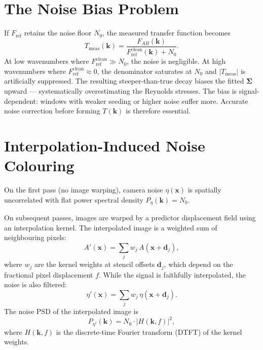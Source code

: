 \documentclass[11pt,a4paper]{article}
\newcommand{\kv}{\mathbf{k}}
\newcommand{\xv}{\mathbf{x}}
\newcommand{\Sigv}{\bm{\Sigma}}
\newcommand{\Fref}{F_\mathrm{ref}}
\newcommand{\Fclean}{F_\mathrm{ref}^\mathrm{clean}}
\begin{document}
\section{The Noise Bias Problem}
\label{sec:noise_bias}

If $\Fref$ retains the noise floor $N_0$, the measured transfer function becomes
%
\begin{equation}
    T_\mathrm{meas}(\kv) = \frac{F_{AB}(\kv)}{\Fclean(\kv) + N_0}.
    \label{eq:t_biased}
\end{equation}
%
At low wavenumbers where $\Fclean \gg N_0$, the noise is negligible.
At high wavenumbers where $\Fclean \approx 0$, the denominator saturates at $N_0$ and $\lvert T_\mathrm{meas}\rvert$ is artificially suppressed.
The resulting steeper-than-true decay biases the fitted $\Sigv$ upward --- systematically overestimating the Reynolds stresses.
The bias is signal-dependent: windows with weaker seeding or higher noise suffer more.
Accurate noise correction before forming $T(\kv)$ is therefore essential.

\section{Interpolation-Induced Noise Colouring}
\label{sec:noise_colouring}

On the first pass (no image warping), camera noise $\eta(\xv)$ is spatially uncorrelated with flat power spectral density $P_\eta(\kv) = N_0$.

On subsequent passes, images are warped by a predictor displacement field using an interpolation kernel.
The interpolated image is a weighted sum of neighbouring pixels:
%
\begin{equation}
    A'(\xv) = \sum_j w_j\, A(\xv + \mathbf{d}_j),
    \label{eq:interp}
\end{equation}
%
where $w_j$ are the kernel weights at stencil offsets $\mathbf{d}_j$, which depend on the fractional pixel displacement $f$.
While the signal is faithfully interpolated, the noise is also filtered:
%
\begin{equation}
    \eta'(\xv) = \sum_j w_j\, \eta(\xv + \mathbf{d}_j).
    \label{eq:noise_interp}
\end{equation}
%
The noise PSD of the interpolated image is
%
\begin{equation}
    P_{\eta'}(\kv) = N_0 \cdot \lvert H(\kv, f) \rvert^2,
    \label{eq:noise_psd_general}
\end{equation}
%
where $H(\kv, f)$ is the discrete-time Fourier transform (DTFT) of the kernel weights.
\end{document}
